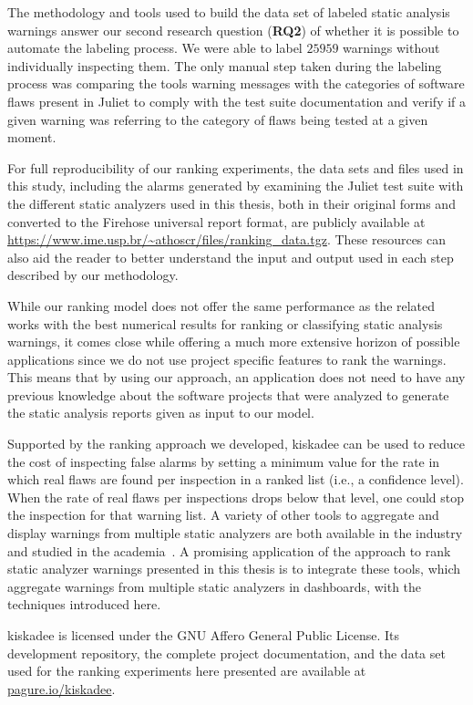 The methodology and tools used to build the data set of labeled static analysis
warnings answer our second research question (\textbf{RQ2}) of whether it is
possible to automate the labeling process. We were able to 
label $25959$ warnings without individually inspecting them. The only manual step
taken during the labeling process was comparing the tools warning messages with
the categories of software flaws present in Juliet to comply with the test suite
documentation and verify if a given warning was referring to the category of flaws
being tested at a given moment.

For full reproducibility of our ranking experiments, the data sets and files
used in this study, including the alarms generated by examining the Juliet test
suite with the different static analyzers used in this thesis, both in their
original forms and converted to the Firehose universal report format, are
publicly available at
\url{https://www.ime.usp.br/~athoscr/files/ranking_data.tgz}. These resources
can also aid the reader to better understand the input and output used in each
step described by our methodology.

While our ranking model does not offer the same performance as the related
works with the best numerical results for ranking or classifying static
analysis warnings, it comes close while offering a much more extensive horizon
of possible applications since we do not use project specific features to rank
the warnings. This means that by using our approach, an application does not
need to have any previous knowledge about the software projects that were
analyzed to generate the static analysis reports given as input to our model.

Supported by the ranking approach we developed, kiskadee can be used to reduce the
cost of inspecting false alarms by setting a minimum value for the rate in
which real flaws are found per inspection in a ranked list (i.e., a confidence
level). When the rate of real flaws per inspections drops below that level, one
could stop the inspection for that warning list. A variety of other tools to
aggregate and display warnings from multiple static analyzers are both
available in the industry and studied in the academia~\citep{buckers2017uav,
heinemann2014teamscale}. A promising application of the approach to rank static
analyzer warnings presented in this thesis is to integrate these tools, which
aggregate warnings from multiple static analyzers in dashboards, with the
techniques introduced here. 

kiskadee is licensed under the GNU Affero General Public License. Its
development repository, the complete project documentation, and the data set
used for the ranking experiments here presented are available at
\url{pagure.io/kiskadee}.

